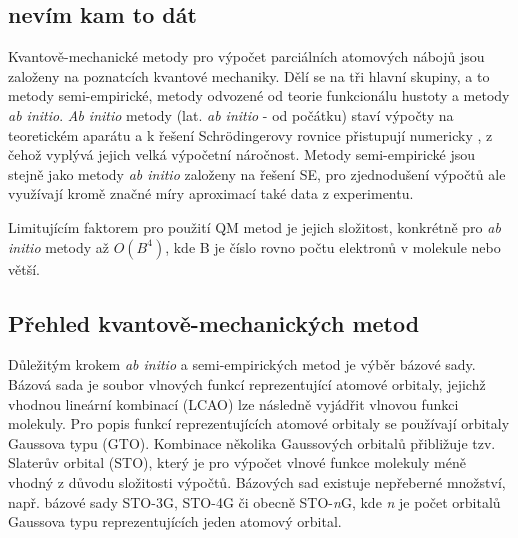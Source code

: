 \subsection{nevím kam to dát}
Kvantově-mechanické metody pro výpočet parciálních atomových nábojů jsou založeny na poznatcích kvantové mechaniky. Dělí se na tři hlavní skupiny, a to metody semi-empirické, metody odvozené od teorie funkcionálu hustoty a metody \textit{ab initio}. \textit{Ab initio} metody (lat. \textit{ab initio} - od počátku) staví výpočty na teoretickém aparátu a k řešení Schrödingerovy rovnice přistupují numericky%
, z čehož vyplývá jejich velká výpočetní náročnost. Metody semi-empirické jsou stejně jako metody \textit{ab initio} založeny na řešení SE, pro zjednodušení výpočtů ale využívají kromě značné míry aproximací také data z experimentu. 

Limitujícím faktorem pro použití QM metod je jejich složitost, konkrétně pro \textit{ab initio} metody až $O(B^4)$, kde B je číslo rovno počtu elektronů v molekule nebo větší. 
 
\subsection{Přehled kvantově-mechanických metod}
Důležitým krokem \textit{ab initio} a semi-empirických metod je výběr bázové sady. Bázová sada je soubor vlnových funkcí reprezentující atomové orbitaly, jejichž vhodnou lineární kombinací (LCAO) lze následně vyjádřit vlnovou funkci molekuly. %
Pro popis funkcí reprezentujících atomové orbitaly se používají orbitaly Gaussova typu (GTO). Kombinace několika Gaussových orbitalů přibližuje tzv. Slaterův orbital (STO), který je pro výpočet vlnové funkce molekuly méně vhodný z důvodu složitosti výpočtů. Bázových sad existuje nepřeberné množství, např. bázové sady STO-3G, STO-4G či obecně STO-\textit{n}G, kde \textit{n} je počet orbitalů Gaussova typu reprezentujících jeden atomový orbital.


